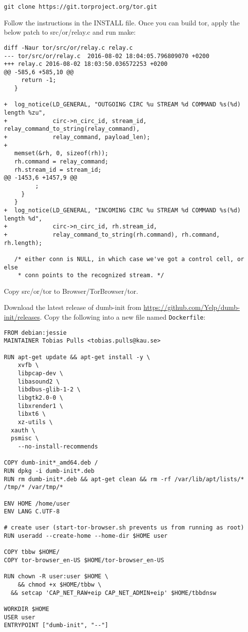 \begin{lstlisting}
git clone https://git.torproject.org/tor.git
\end{lstlisting}
Follow the instructions in the INSTALL file. Once you can build tor,
apply the below patch to src/or/relay.c and run make:
\begin{lstlisting}
diff -Naur tor/src/or/relay.c relay.c
--- tor/src/or/relay.c	2016-08-02 18:04:05.796809070 +0200
+++ relay.c	2016-08-02 18:03:50.036572253 +0200
@@ -585,6 +585,10 @@
     return -1;
   }

+  log_notice(LD_GENERAL, "OUTGOING CIRC %u STREAM %d COMMAND %s(%d) length %zu",
+             circ->n_circ_id, stream_id, relay_command_to_string(relay_command),
+             relay_command, payload_len);
+
   memset(&rh, 0, sizeof(rh));
   rh.command = relay_command;
   rh.stream_id = stream_id;
@@ -1453,6 +1457,9 @@
         ;
     }
   }
+  log_notice(LD_GENERAL, "INCOMING CIRC %u STREAM %d COMMAND %s(%d) length %d",
+             circ->n_circ_id, rh.stream_id,
+             relay_command_to_string(rh.command), rh.command, rh.length);

   /* either conn is NULL, in which case we've got a control cell, or else
    * conn points to the recognized stream. */
\end{lstlisting}
Copy src/or/tor to Browser/TorBrowser/tor.

Download the latest release of dumb-init from
\url{https://github.com/Yelp/dumb-init/releases}.
Copy the following into a
new file named \texttt{Dockerfile}:

\begin{lstlisting}
FROM debian:jessie
MAINTAINER Tobias Pulls <tobias.pulls@kau.se>

RUN apt-get update && apt-get install -y \
	xvfb \
	libpcap-dev \
	libasound2 \
	libdbus-glib-1-2 \
	libgtk2.0-0 \
	libxrender1 \
	libxt6 \
	xz-utils \
  xauth \
  psmisc \
	--no-install-recommends

COPY dumb-init*_amd64.deb /
RUN dpkg -i dumb-init*.deb
RUN rm dumb-init*.deb && apt-get clean && rm -rf /var/lib/apt/lists/* /tmp/* /var/tmp/*

ENV HOME /home/user
ENV LANG C.UTF-8

# create user (start-tor-browser.sh prevents us from running as root)
RUN useradd --create-home --home-dir $HOME user

COPY tbbw $HOME/
COPY tor-browser_en-US $HOME/tor-browser_en-US

RUN chown -R user:user $HOME \
	&& chmod +x $HOME/tbbw \
  && setcap 'CAP_NET_RAW+eip CAP_NET_ADMIN+eip' $HOME/tbbdnsw

WORKDIR $HOME
USER user
ENTRYPOINT ["dumb-init", "--"]
\end{lstlisting}

